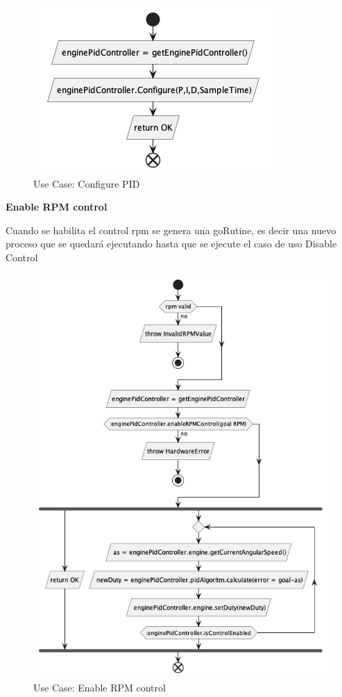 \begin{figure}[H]
    \centering
    \includegraphics[height=0.2\textheight]{./part/Proyecto_ejecutivo/memoria_descriptiva/descripcionDelProyecto/control/uml/configurePID}
    \caption{Use Case: Configure PID}\label{fig:Use Case-Configure PID}
\end{figure}

\textbf{Enable RPM control}

Cuando se habilita el control rpm se genera una goRutine, es decir una nuevo proceso que se quedará ejecutando hasta que se ejecute el caso de uso Disable Control

\begin{figure}[H]
    \centering
    \includegraphics[height=0.5\textheight]{./part/Proyecto_ejecutivo/memoria_descriptiva/descripcionDelProyecto/control/uml/enableRPMControl}
    \caption{Use Case: Enable RPM control}\label{fig:Use Case- Enable RPM control}
\end{figure}


